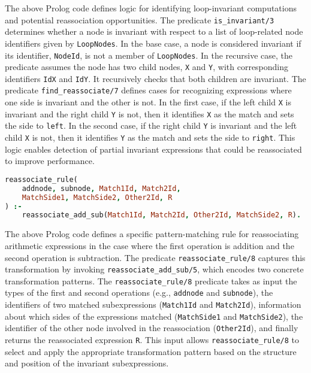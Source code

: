 \smallbreak
The above Prolog code defines logic for identifying loop-invariant computations and potential reassociation opportunities. The predicate \texttt{is\_invariant/3} determines whether a node is invariant with respect to a list of loop-related node identifiers given by \texttt{LoopNodes}. In the base case, a node is considered invariant if its identifier, \texttt{NodeId}, is not a member of \texttt{LoopNodes}. In the recursive case, the predicate assumes the node has two child nodes, \texttt{X} and \texttt{Y}, with corresponding identifiers \texttt{IdX} and \texttt{IdY}. It recursively checks that both children are invariant. The predicate \texttt{find\_reassociate/7} defines cases for recognizing expressions where one side is invariant and the other is not. In the first case, if the left child \texttt{X} is invariant and the right child \texttt{Y} is not, then it identifies \texttt{X} as the match and sets the side to \texttt{left}. In the second case, if the right child \texttt{Y} is invariant and the left child \texttt{X} is not, then it identifies \texttt{Y} as the match and sets the side to \texttt{right}. 
This logic enables detection of partial invariant expressions that could be reassociated to improve performance.

\smallbreak
\begin{lstlisting}[language=Prolog]
% Rule for addnode with subnode
reassociate_rule(
    addnode, subnode, Match1Id, Match2Id, 
    MatchSide1, MatchSide2, Other2Id, R
) :-
    reassociate_add_sub(Match1Id, Match2Id, Other2Id, MatchSide2, R).
\end{lstlisting}

\newpage
The above Prolog code defines a specific pattern-matching rule for reassociating arithmetic expressions in the case where the first operation is addition and the second operation is subtraction. The predicate \texttt{reassociate\_rule/8} captures this transformation by invoking \texttt{reassociate\_add\_sub/5}, which encodes two concrete transformation patterns.
The \texttt{reassociate\_rule/8} predicate takes as input the types of the first and second operations (e.g., \texttt{addnode} and \texttt{subnode}), the identifiers of two matched subexpressions (\texttt{Match1Id} and \texttt{Match2Id}), information about which sides of the expressions matched (\texttt{MatchSide1} and \texttt{MatchSide2}), the identifier of the other node involved in the reassociation (\texttt{Other2Id}), and finally returns the reassociated expression \texttt{R}. This input allows \texttt{reassociate\_rule/8} to select and apply the appropriate transformation pattern based on the structure and position of the invariant subexpressions.

